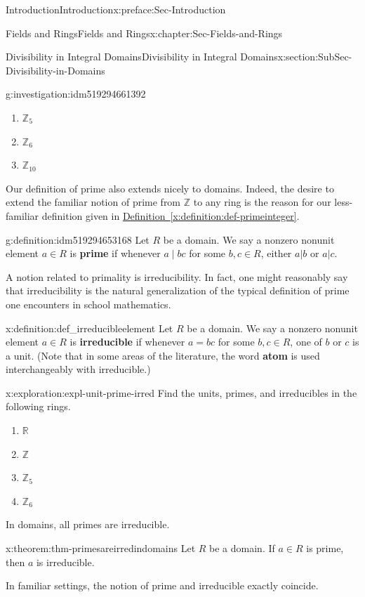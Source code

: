 \documentclass[oneside,10pt,]{book}
\newcommand{\xreffont}{\relax}
\newcommand{\terminology}[1]{\textbf{#1}}
\numberwithin{equation}{section}
\def\Z{{\mathbb Z}}
\def\R{{\mathbb R}}
\begin{document}
\begin{preface}{Introduction}{}{Introduction}{}{}{x:preface:Sec-Introduction}
\begin{chapterptx}{Fields and Rings}{}{Fields and Rings}{}{}{x:chapter:Sec-Fields-and-Rings}
\begin{sectionptx}{Divisibility in Integral Domains}{}{Divisibility in Integral Domains}{}{}{x:section:SubSec-Divisibility-in-Domains}
\begin{investigation}{}{g:investigation:idm519294661392}
\begin{enumerate}
\item{}\(\displaystyle \Z_5\)%
\item{}\(\displaystyle \Z_6\)%
\item{}\(\displaystyle \Z_{10}\)%
\end{enumerate}
\end{investigation}
Our definition of prime also extends nicely to domains. Indeed, the desire to extend the familiar notion of prime from \(\Z\) to any ring is the reason for our less-familiar definition given in \hyperref[x:definition:def-primeinteger]{Definition~{\xreffont\ref{x:definition:def-primeinteger}}}.%
\begin{definition}{}{g:definition:idm519294653168}%
Let \(R\) be a domain. We say a nonzero nonunit element \(a\in R\) is \terminology{prime} if whenever \(a\mid bc\) for some \(b,c\in R\), either \(a|b\) or \(a|c\).%
\end{definition}
A notion related to primality is irreducibility. In fact, one might reasonably say that irreducibility is the natural generalization of the typical definition of prime one encounters in school mathematics.%
\begin{definition}{}{x:definition:def_irreducibleelement}%
%
%
Let \(R\) be a domain. We say a nonzero nonunit element \(a\in R\) is \terminology{irreducible} if whenever \(a = bc\) for some \(b,c\in R\), one of \(b\) or \(c\) is a unit. (Note that in some areas of the literature, the word \terminology{atom} is used interchangeably with irreducible.)%
\end{definition}
\begin{exploration}{}{x:exploration:expl-unit-prime-irred}%
Find the units, primes, and irreducibles in the following rings.%
%
\begin{enumerate}
\item{}\(\displaystyle \R\)%
\item{}\(\displaystyle \Z\)%
\item{}\(\displaystyle \Z_{5}\)%
\item{}\(\displaystyle \Z_6\)%
\end{enumerate}
\end{exploration}
In domains, all primes are irreducible.%
\begin{theorem}{}{}{x:theorem:thm-primesareirredindomains}%
Let \(R\) be a domain. If \(a\in R\) is prime, then \(a\) is irreducible.%
\end{theorem}
In familiar settings, the notion of prime and irreducible exactly coincide.%

\end{sectionptx}
\end{chapterptx}
\end{preface}
\end{document}

